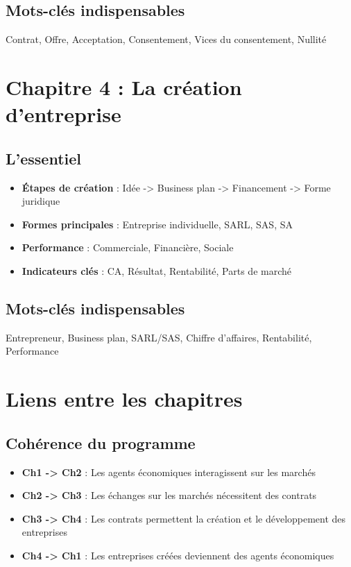 \documentclass[12pt,a4paper]{article}
\begin{document}
\subsection{Mots-clés indispensables}
Contrat, Offre, Acceptation, Consentement, Vices du consentement, Nullité

\section{Chapitre 4 : La création d'entreprise}

\subsection{L'essentiel}
\begin{itemize}
    \item \textbf{Étapes de création} : Idée -> Business plan -> Financement -> Forme juridique
    \item \textbf{Formes principales} : Entreprise individuelle, SARL, SAS, SA
    \item \textbf{Performance} : Commerciale, Financière, Sociale
    \item \textbf{Indicateurs clés} : CA, Résultat, Rentabilité, Parts de marché
\end{itemize}

\subsection{Mots-clés indispensables}
Entrepreneur, Business plan, SARL/SAS, Chiffre d'affaires, Rentabilité, Performance

\section{Liens entre les chapitres}

\subsection{Cohérence du programme}
\begin{itemize}
    \item \textbf{Ch1 -> Ch2} : Les agents économiques interagissent sur les marchés
    \item \textbf{Ch2 -> Ch3} : Les échanges sur les marchés nécessitent des contrats
    \item \textbf{Ch3 -> Ch4} : Les contrats permettent la création et le développement des entreprises
    \item \textbf{Ch4 -> Ch1} : Les entreprises créées deviennent des agents économiques
\end{itemize}
\end{document}
